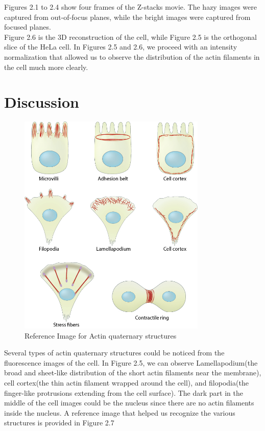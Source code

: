 \documentclass[a4paper,english,12pt,bibliography=totoc]{scrreprt}
\begin{document}
Figures 2.1 to 2.4 show four frames of the Z-stacks movie. The hazy images were captured from out-of-focus planes, while the bright images were captured from focused planes.\\


Figure 2.6 is the 3D reconstruction of the cell, while Figure 2.5 is the orthogonal slice of the HeLa cell. In Figures 2.5 and 2.6, we proceed with an intensity normalization that allowed us to observe the distribution of the actin filaments in the cell much more clearly. 


\section{Discussion}


\begin{figure}[H]
    \centering
    \includegraphics[width = 0.8\textwidth]{Images/Actins/actin-filament-distribution.jpg}
    \caption{Reference Image for Actin quaternary structures\cite{Actin_quanternary_structures}}
    \label{fig:enter-label}
\end{figure}

Several types of actin quaternary structures could be noticed from the fluorescence images of the cell. In Figure 2.5, we can observe Lamellapodium(the broad and sheet-like distribution of the short actin filaments near the membrane), cell cortex(the thin actin filament wrapped around the cell), and filopodia(the finger-like protrusions extending from the cell surface). The dark part in the middle of the cell images could be the nucleus since there are no actin filaments inside the nucleus. A reference image that helped us recognize the various structures is provided in Figure 2.7\\
\end{document}
